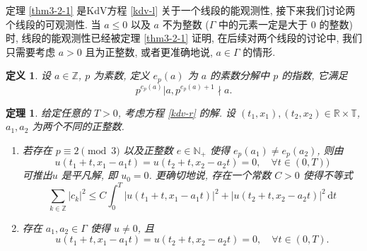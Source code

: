 \documentclass[master]{cugthesis}
\newcommand\N{\ensuremath{\mathbb{N}}}
\newcommand\R{\ensuremath{\mathbb{R}}}
\newcommand\Z{\ensuremath{\mathbb{Z}}}
\newcommand\T{\ensuremath{\mathbb{T}}}
\renewcommand\d{\ensuremath{\,\mathrm{d}}}
\newtheorem{theorem}{定理}[chapter]
\newtheorem{definition}{定义}[chapter]
\begin{document}
    
定理 \ref{thm3-2-1} 是KdV方程 \eqref{kdv-l} 关于一个线段的能观测性, 接下来我们讨论两个线段的可观测性. 当 $a\le 0$ 以及 $a$ 不为整数 ($\Gamma$ 中的元素一定是大于 $0$ 的整数) 时, 线段的能观测性已经被定理 \ref{thm3-2-1} 证明, 在后续对两个线段的讨论中, 我们只需要考虑 $ a>0 $ 且为正整数, 或者更准确地说, $a\in \Gamma$ 的情形. 
    
\begin{definition}
设 $a\in \Z$, $p$ 为素数, 定义 $e_p(a)$ 为 $a$ 的素数分解中 $p$ 的指数, 它满足
\begin{equation*}
    p^{e_p(a)}|a,p^{e_p(a)+1}\nmid a.
\end{equation*}
\end{definition}
 \begin{theorem}\label{thm-3-2-2}
 给定任意的 $T>0$, 考虑方程 \eqref{kdv-r} 的解. 设 $(t_1,x_1),(t_2,x_2)\in \R\times \T$, $a_1,a_2$ 为两个不同的正整数. 
 \begin{enumerate}
     \item[\rm{(1)}] 若存在 $p\equiv 2\pmod{3}$ 以及正整数 $e\in \N_{+}$ 使得 $e_p(a_1)\neq e_p(a_2)$, 则由 
    \begin{equation*}
        u(t_1+t,x_1-a_1t)=u(t_2+t,x_2-a_2t)=0,\quad \forall t\in (0,T))
    \end{equation*}
    可推出$u$ 是平凡解, 即 $u_0=0$. 更确切地说, 存在一个常数 $C>0$ 使得不等式   
    \begin{equation}
        \sum_{k\in\Z} |c_k|^2\le C\int_0^T|u(t_1+t,x_1-a_1t)|^2+|u(t_2+t,x_2-a_2t)|^2 \d t \label{3-2-10}
    \end{equation}
    \item [\rm{(3)}] 存在 $a_1,a_2\in \Gamma$ 使得 $u\neq 0$, 且
     \begin{equation*}
        u(t_1+t,x_1-a_1t)=u(t_2+t,x_2-a_2t)=0,\quad \forall t\in (0,T).
    \end{equation*}
 \end{enumerate}
 \end{theorem}
\end{document}
